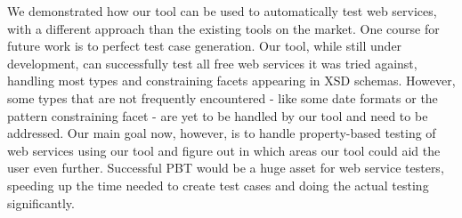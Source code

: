 \documentclass[submission,copyright]{eptcs}
\begin{document}
We demonstrated how our tool can be used to automatically test web services, 
with a different approach than the existing tools on the market. 
One course for future work is to perfect test case generation. Our tool, 
while still under development, can successfully test all free web
services it was tried against, handling most types and constraining
facets appearing in XSD schemas. However, some types that are not
frequently encountered - like some date formats or the pattern
constraining facet - are yet to be handled by our tool and need to be addressed.
Our main goal now, however, is to handle property-based testing of web services 
using our tool and figure out in which areas our tool could aid the user even 
further. Successful PBT would be a huge asset for web service testers, speeding 
up the time needed to create test cases and doing the actual testing 
significantly.



\end{document}
